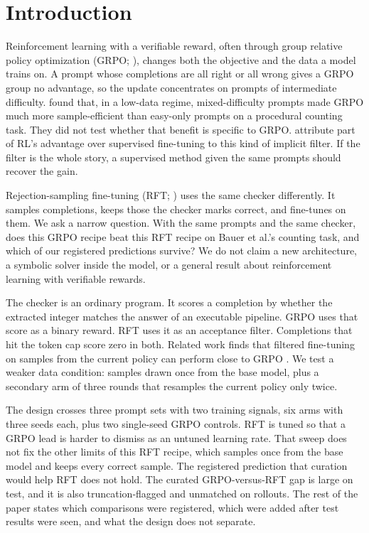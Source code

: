\section{Introduction}
\label{sec:intro}

Reinforcement learning with a verifiable reward, often through group relative policy optimization (GRPO; \citealp{shao2024deepseekmath}), changes both the objective and the data a model trains on. A prompt whose completions are all right or all wrong gives a GRPO group no advantage, so the update concentrates on prompts of intermediate difficulty. \citet{bauer2026} found that, in a low-data regime, mixed-difficulty prompts made GRPO much more sample-efficient than easy-only prompts on a procedural counting task. They did not test whether that benefit is specific to GRPO. \citet{lu2026why} attribute part of RL's advantage over supervised fine-tuning to this kind of implicit filter. If the filter is the whole story, a supervised method given the same prompts should recover the gain.

Rejection-sampling fine-tuning (RFT; \citealp{yuan2023scaling}) uses the same checker differently. It samples completions, keeps those the checker marks correct, and fine-tunes on them. We ask a narrow question. With the same prompts and the same checker, does this GRPO recipe beat this RFT recipe on Bauer et al.'s counting task, and which of our registered predictions survive? We do not claim a new architecture, a symbolic solver inside the model, or a general result about reinforcement learning with verifiable rewards.

The checker is an ordinary program. It scores a completion by whether the extracted integer matches the answer of an executable pipeline. GRPO uses that score as a binary reward. RFT uses it as an acceptance filter. Completions that hit the token cap score zero in both. Related work finds that filtered fine-tuning on samples from the current policy can perform close to GRPO \citep{xiong2025minimalist,samineni2025rl}. We test a weaker data condition: samples drawn once from the base model, plus a secondary arm of three rounds that resamples the current policy only twice.

The design crosses three prompt sets with two training signals, six arms with three seeds each, plus two single-seed GRPO controls. RFT is tuned so that a GRPO lead is harder to dismiss as an untuned learning rate. That sweep does not fix the other limits of this RFT recipe, which samples once from the base model and keeps every correct sample. The registered prediction that curation would help RFT does not hold. The curated GRPO-versus-RFT gap is large on test, and it is also truncation-flagged and unmatched on rollouts. The rest of the paper states which comparisons were registered, which were added after test results were seen, and what the design does not separate.

